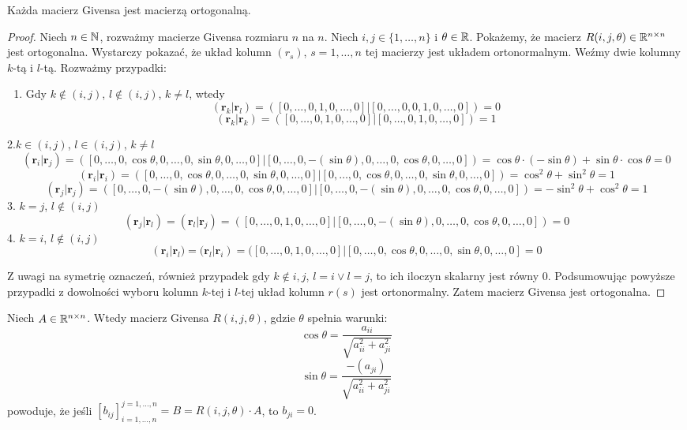 \documentclass[12pt,a4paper]{report}
\newcommand{\vr}[1]{\mathbf{#1}}
\newcommand{\mx}[1]{{#1}}
\begin{document}
\begin{lemma}
Każda macierz Givensa jest macierzą ortogonalną.
\end{lemma}

\begin{proof}
Niech $n\in \mathbb{N}$, rozważmy macierze Givensa rozmiaru $n$ na $n$. Niech $i,j \in \{1,\ldots, n\}$ i $\theta \in \mathbb{R}$. Pokażemy, że macierz $\mx{R}(i,j,\theta) \in \setR^{n\times n}$ jest ortogonalna.
Wystarczy pokazać, że układ kolumn $(r_s)$, $s=1,\ldots, n$ tej macierzy jest układem ortonormalnym. Weźmy dwie kolumny $k$-tą i $l$-tą. Rozważmy przypadki:
\begin{enumerate}
\item Gdy $k\notin (i,j)$, $l\notin (i,j)$, $k \neq l$, wtedy
$$
(\vr{r}_{k}|\vr{r}_{l}) = ([0,\ldots, 0,1,0,\ldots,0]|[0,\ldots,0,0,1,0,\ldots,0]) = 0
$$
$$
(\vr{r}_{k}|\vr{r}_{k}) = ([0,\ldots, 0,1,0,\ldots,0]|[0,\ldots,0,1,0,\ldots,0]) = 1
$$
\end{enumerate}

2.$k \in (i,j)$, $l \in (i,j)$, $k \neq l$
{\scriptsize
$$
(\vr{r}_{i}|\vr{r}_{j}) = ([0,\ldots, 0,\cos\theta,0,\ldots,0,\sin\theta,0,\ldots,0]|[0,\ldots, 0,-(\sin\theta),0,\ldots,0,\cos\theta,0,\ldots,0]) = \cos\theta\cdot(-\sin\theta) + \sin\theta\cdot\cos\theta = 0
$$
$$
(\vr{r}_{i}|\vr{r}_{i}) = ([0,\ldots, 0,\cos\theta,0,\ldots,0,\sin\theta,0,\ldots,0]|[0,\ldots, 0,\cos\theta,0,\ldots,0,\sin\theta,0,\ldots,0]) = \cos^{2}\theta + \sin^{2}\theta = 1
$$
$$
(\vr{r}_{j}|\vr{r}_{j}) = ([0,\ldots, 0,-(\sin\theta),0,\ldots,0,\cos\theta,0,\ldots,0]|[0,\ldots, 0,-(\sin\theta),0,\ldots,0,\cos\theta,0,\ldots,0]) = -\sin^{2}\theta + \cos^{2}\theta = 1
$$
}
3. $k=j$, $l\notin (i,j)$
$$
(\vr{r}_{j}|\vr{r}_{l}) = (\vr{r}_{l}|\vr{r}_{j})= ([0,\ldots, 0,1,0,\ldots,0]|[0,\ldots, 0,-(\sin\theta),0,\ldots,0,\cos\theta,0,\ldots,0]) = 0
$$
4. $k=i$, $l\notin(i,j)$
$$
(\vr{r}_{i}|\vr{r}_{l}) = (\vr{r}_{l}|\vr{r}_{i})= ([0,\ldots, 0,1,0,\ldots,0]|[0,\ldots, 0,\cos\theta,0,\ldots,0,\sin\theta,0,\ldots,0] = 0
$$

Z uwagi na symetrię oznaczeń, również przypadek gdy $k\notin{i,j}$, $l=i \lor l=j$, to ich iloczyn skalarny jest równy $0$. Podsumowując powyższe przypadki z dowolności wyboru kolumn $k$-tej i $l$-tej układ kolumn $r(s)$ jest ortonormalny. Zatem macierz Givensa jest ortogonalna.
\end{proof}

\begin{lemma}
Niech $\mx{A} \in \setR^{n \times n}$. Wtedy macierz Givensa $\mx{R}(i,j, \theta)$, gdzie $\theta$ spełnia warunki:
$$
\cos\theta = \frac{a_{ii}}{\sqrt{a_{ii}^{2} + a_{ji}^{2}}}
$$
$$
\sin\theta = \frac{-(a_{ji})}{\sqrt{a_{ii}^{2} + a_{ji}^{2}}}
$$
powoduje, że jeśli $[b_{ij}]_{i=1,\ldots,n}^{j=1,\ldots,n} = \mx{B} = \mx{R}(i,j,\theta)\cdot \mx{A}$, to 
$b_{ji}=0$.
\end{lemma}
\end{document}
